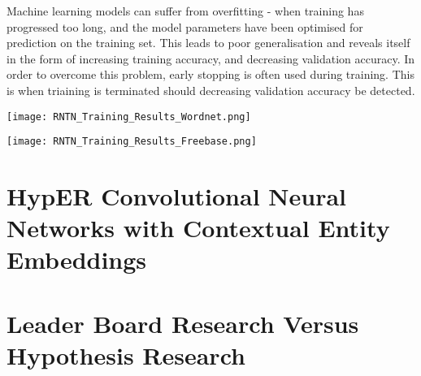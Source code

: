 Machine learning models can suffer from overfitting \cite{reference} - when training has progressed too long, and the model parameters have been optimised for prediction on the training set. This leads to poor generalisation  and reveals itself in the form of increasing training accuracy, and decreasing validation accuracy. In order to overcome this problem, early stopping is often used during training. This is when triaining is terminated should decreasing validation accuracy be detected.\newline

\begin{center}
    \texttt{[image: RNTN\_Training\_Results\_Wordnet.png]}
\end{center}

\begin{center}
    \texttt{[image: RNTN\_Training\_Results\_Freebase.png]}
\end{center}



\section{HypER Convolutional Neural Networks with Contextual Entity Embeddings}

\section{Leader Board Research Versus Hypothesis Research}

